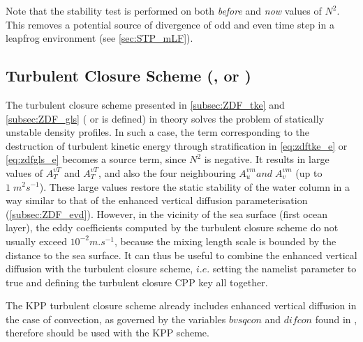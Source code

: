 \documentclass[../tex_main/NEMO_manual]{subfiles}
\begin{document}
Note that the stability test is performed on both \textit{before} and \textit{now} values of $N^2$.
This removes a potential source of divergence of odd and even time step in
a leapfrog environment \citep{Leclair_PhD2010} (see \autoref{sec:STP_mLF}).

\subsection[Turbulent closure scheme (\protect\key{zdf}\{tke,gls,osm\})]{Turbulent Closure Scheme (\protect{}, \protect{} or \protect{})}
\label{subsec:ZDF_tcs}

The turbulent closure scheme presented in \autoref{subsec:ZDF_tke} and \autoref{subsec:ZDF_gls}
( or  is defined) in theory solves the problem of statically unstable density profiles.
In such a case, the term corresponding to the destruction of turbulent kinetic energy through stratification in
\autoref{eq:zdftke_e} or \autoref{eq:zdfgls_e} becomes a source term, since $N^2$ is negative. 
It results in large values of $A_T^{vT}$ and  $A_T^{vT}$, and also the four neighbouring $A_u^{vm} {and}\;A_v^{vm}$
(up to $1\;m^2s^{-1}$).
These large values restore the static stability of the water column in a way similar to that of
the enhanced vertical diffusion parameterisation (\autoref{subsec:ZDF_evd}).
However, in the vicinity of the sea surface (first ocean layer), the eddy coefficients computed by
the turbulent closure scheme do not usually exceed $10^{-2}m.s^{-1}$,
because the mixing length scale is bounded by the distance to the sea surface.
It can thus be useful to combine the enhanced vertical diffusion with the turbulent closure scheme,
$i.e.$ setting the  namelist parameter to true and
defining the turbulent closure CPP key all together.

The KPP turbulent closure scheme already includes enhanced vertical diffusion in the case of convection,
as governed by the variables $bvsqcon$ and $difcon$ found in ,
therefore  should be used with the KPP scheme.

\end{document}
